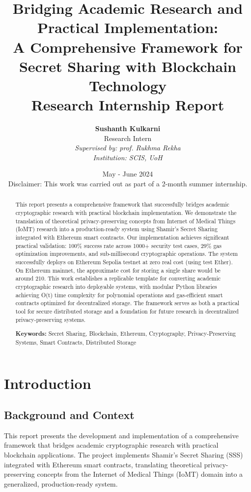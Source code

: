 \documentclass[12pt,a4paper]{article}
\title{
    \vspace{-2cm}
    \huge\textbf{Bridging Academic Research and Practical Implementation:} \\
    \vspace{0.5cm}
    \LARGE{A Comprehensive Framework for Secret Sharing with Blockchain Technology} \\
    \vspace{1cm}
    \large{Research Internship Report}
}
\author{
    \textbf{Sushanth Kulkarni} \\
    Research Intern \\
    \vspace{0.5cm}
    \textit{Supervised by: prof. Rukhma Rekha} \\
    \textit{Institution: SCIS, UoH}
}
\date{May - June 2024 \\
\vspace{0.3cm}
\vspace{0.2cm}
\small{Disclaimer: This work was carried out as part of a 2-month summer internship.}
}
\newcommand{\rupee}{\text{Rs.}}  %
\begin{document}
\maketitle
\thispagestyle{empty}

\newpage

\begin{abstract}
This report presents a comprehensive framework that successfully bridges academic cryptographic research with practical blockchain implementation. We demonstrate the translation of theoretical privacy-preserving concepts from Internet of Medical Things (IoMT) research into a production-ready system using Shamir's Secret Sharing integrated with Ethereum smart contracts. Our implementation achieves significant practical validation: 100\% success rate across 1000+ security test cases, 29\% gas optimization improvements, and sub-millisecond cryptographic operations. The system successfully deploys on Ethereum Sepolia testnet at zero real cost (using test Ether). On Ethereum mainnet, the approximate cost for storing a single share would be around \rupee210. This work establishes a replicable template for converting academic cryptographic research into deployable systems, with modular Python libraries achieving O(t) time complexity for polynomial operations and gas-efficient smart contracts optimized for decentralized storage. The framework serves as both a practical tool for secure distributed storage and a foundation for future research in decentralized privacy-preserving systems.

\textbf{Keywords:} Secret Sharing, Blockchain, Ethereum, Cryptography, Privacy-Preserving Systems, Smart Contracts, Distributed Storage
\end{abstract}

\newpage
\tableofcontents
\newpage
\section{Introduction}
\subsection{Background and Context}

This report presents the development and implementation of a comprehensive framework that bridges academic cryptographic research with practical blockchain applications. The project implements Shamir's Secret Sharing (SSS) integrated with Ethereum smart contracts, translating theoretical privacy-preserving concepts from the Internet of Medical Things (IoMT) domain into a generalized, production-ready system.
\end{document}
